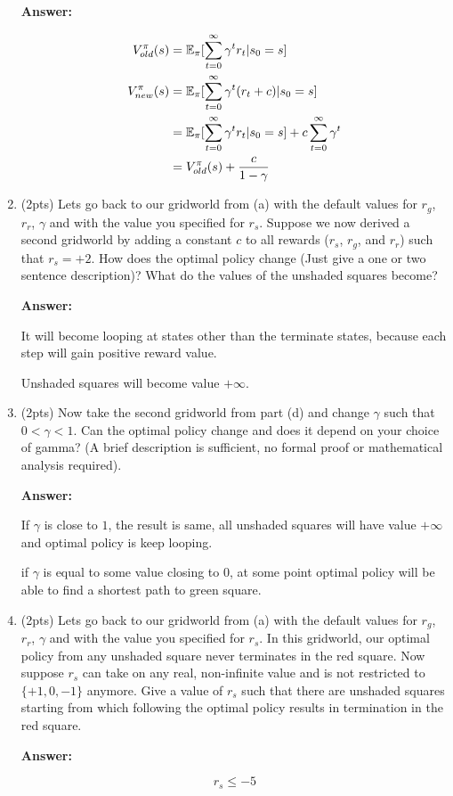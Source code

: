 \begin{enumerate}[label=(\alph*)]
\textbf{Answer:}

\begin{equation}
\begin{split}
V^\pi_{old}(s) & = \mathbb E_{\pi}[\sum_{t=0}^{\infty} \gamma^{t}r_t|s_0=s] \\
V^\pi_{new}(s) & = \mathbb E_{\pi}[\sum_{t=0}^{\infty}\gamma^{t}(r_t + c)|s_0=s] \\
               & = \mathbb E_{\pi}[\sum_{t=0}^{\infty}\gamma^{t}r_t|s_0=s] + c\sum_{t=0}^{\infty}\gamma^{t} \\
               & = V^\pi_{old}(s) + \frac{c}{1-\gamma}
\end{split}
\end{equation}



\item (2pts) Lets go back to our gridworld from (a) with the default values for $r_g$, $r_r$, $\gamma$ and with the value you specified for $r_s$. Suppose we now derived a second gridworld by adding a constant $c$ to all rewards ($r_s$, $r_g$, and $r_r$) such that $r_s = +2$. How does the optimal policy change (Just give a one or two sentence description)? What do the values of the unshaded squares become?

\textbf{Answer:}

It will become looping at states other than the terminate states, because each step will gain positive reward value.

Unshaded squares will become value $+\infty$.

\item (2pts) Now take the second gridworld from part (d) and change $\gamma$ such that $0 < \gamma < 1$. Can the optimal policy change and does it depend on your choice of gamma? (A brief description is sufficient, no formal proof or mathematical analysis required).

\textbf{Answer:}

If $\gamma$ is close to $1$, the result is same, all unshaded squares will have value $+\infty$ and optimal policy is keep looping.

if $\gamma$ is equal to some value closing to $0$, at some point optimal policy will be able to find a shortest path to green square.

\item (2pts) Lets go back to our gridworld from (a) with the default values for $r_g$, $r_r$, $\gamma$ and with the value you specified for $r_s$. In this gridworld, our optimal policy from any unshaded square never terminates in the red square. Now suppose $r_s$ can take on any real, non-infinite value and is not restricted to $\{+1, 0, -1\}$ anymore. Give a value of $r_s$ such that there are unshaded squares starting from which following the optimal policy results in termination in the red square.

\textbf{Answer:}

\begin{equation}
r_s \leq -5
\end{equation}


\end{enumerate}
